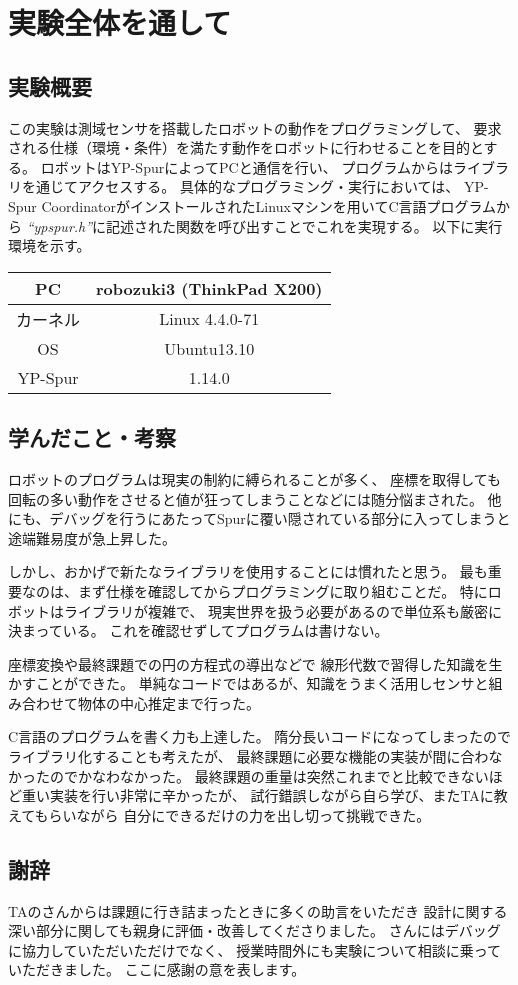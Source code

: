 \documentclass[main]{subfiles}
\begin{document}
\chapter{実験全体を通して}
\section{実験概要}
この実験は測域センサを搭載したロボットの動作をプログラミングして、
要求される仕様（環境・条件）を満たす動作をロボットに行わせることを目的とする。
ロボットはYP-SpurによってPCと通信を行い、
プログラムからはライブラリを通じてアクセスする。
具体的なプログラミング・実行においては、
YP-Spur CoordinatorがインストールされたLinuxマシンを用いてC言語プログラムから
\textit{``ypspur.h''}に記述された関数を呼び出すことでこれを実現する。
以下に実行環境を示す。

\begin{table}[H]
	\centering
	\begin{tabular}{|c|c|}
		\hline
		PC & robozuki3 (ThinkPad X200)  \\\hline
		カーネル & Linux 4.4.0-71\\\hline
		OS & Ubuntu13.10\\\hline
		YP-Spur & 1.14.0\\\hline
	\end{tabular}
\end{table}

\section{学んだこと・考察}
ロボットのプログラムは現実の制約に縛られることが多く、
座標を取得しても回転の多い動作をさせると値が狂ってしまうことなどには随分悩まされた。
他にも、デバッグを行うにあたってSpurに覆い隠されている部分に入ってしまうと
途端難易度が急上昇した。

しかし、おかげで新たなライブラリを使用することには慣れたと思う。
最も重要なのは、まず仕様を確認してからプログラミングに取り組むことだ。
特にロボットはライブラリが複雑で、
現実世界を扱う必要があるので単位系も厳密に決まっている。
これを確認せずしてプログラムは書けない。

座標変換や最終課題での円の方程式の導出などで
線形代数で習得した知識を生かすことができた。
単純なコードではあるが、知識をうまく活用しセンサと組み合わせて物体の中心推定まで行った。

C言語のプログラムを書く力も上達した。
隋分長いコードになってしまったのでライブラリ化することも考えたが、
最終課題に必要な機能の実装が間に合わなかったのでかなわなかった。
最終課題の重量は突然これまでと比較できないほど重い実装を行い非常に辛かったが、
試行錯誤しながら自ら学び、またTAに教えてもらいながら
自分にできるだけの力を出し切って挑戦できた。

\section{謝辞}
TAの\TAa さんからは課題に行き詰まったときに多くの助言をいただき
設計に関する深い部分に関しても親身に評価・改善してくださりました。
\TAb さんにはデバッグに協力していただいただけでなく、
授業時間外にも実験について相談に乗っていただきました。
ここに感謝の意を表します。
\end{document}
